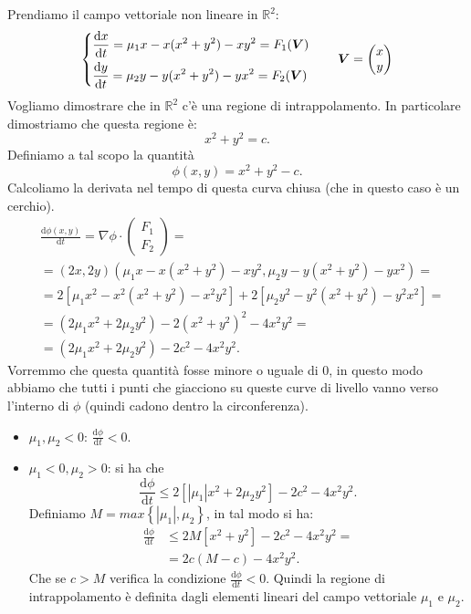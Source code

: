 \begin{exmp}
    Prendiamo il campo vettoriale non lineare in $\mathbb{R}^2$:
    \[
    \begin{dcases}
	\frac{\text{d} x}{\text{d} t} = \mu_1x-x(x^2+y^2) -xy^2 = F_1(\boldsymbol{V}) \\
	\frac{\text{d} y}{\text{d} t} = \mu_2y-y(x^2+y^2) -yx^2 = F_2(\boldsymbol{V}) 
    \end{dcases}
    \qquad \boldsymbol{V} = \begin{pmatrix} x \\ y \end{pmatrix}
    \]
    Vogliamo dimostrare che in $\mathbb{R}^2$ c'è una regione di intrappolamento. In particolare dimostriamo che questa regione è:
    \[
        x^2+y^2=c
    .\] 
    Definiamo a tal scopo la quantità
    \[
	\phi(x, y) = x^2+y^2-c
    .\] 
    Calcoliamo la derivata nel tempo di questa curva chiusa (che in questo caso è un cerchio).
    \[\begin{aligned}
	&\frac{\text{d} \phi (x, y) }{\text{d} t} = \nabla \phi  \cdot \begin{pmatrix} F_1 \\ F_2 \end{pmatrix} = \\
	&= (2x, 2y) (\mu_1x-x(x^2+y^2)-xy^2, \mu_2y-y(x^2+y^2) - yx^2) = \\
	&= 2\left[\mu_1x^2-x^2(x^2+y^2) - x^2 y^2\right] + 2\left[\mu_2y^2-y^2(x^2+y^2) - y^2x^2\right] = \\
	&= (2\mu_1x^2+2\mu_2y^2) - 2(x^2+y^2)^2 - 4 x^2y^2 = \\
	&= (2\mu_1x^2+2\mu_2y^2) -2c^2 - 4x^2y^2 
    .\end{aligned}\]
    Vorremmo che questa quantità fosse minore o uguale di $0$, in questo modo abbiamo che tutti i punti che giacciono su queste curve di livello vanno verso l'interno di $\phi$ (quindi cadono dentro la circonferenza).
    \begin{itemize}
        \item $\mu_1, \mu_2 < 0$: $\frac{\text{d} \phi}{\text{d} t} < 0 $.
	\item $\mu_1 < 0, \mu_2 > 0$: si ha che
	    \[
	        \frac{\text{d} \phi}{\text{d} t}  \le 2\left[\left|\mu_1\right|x^2+2\mu_2y^2\right]-2c^2-4x^2y^2
	    .\] 
	    Definiamo $M = max\left\{\left|\mu_1\right|, \mu_2\right\}$, in tal modo si ha:
	    \[\begin{aligned}
		\frac{\text{d} \phi}{\text{d} t}  &\le 2M\left[x^2+y^2\right]-2c^2-4x^2y^2 = \\
									   &=2c(M-c) - 4x^2y^2
	    .\end{aligned}\]
		Che se $c>M$ verifica la condizione $\frac{\text{d} \phi}{\text{d} t} < 0$. Quindi la regione di intrappolamento è definita dagli elementi lineari del campo vettoriale $\mu_1$ e $\mu_2$.
    \end{itemize}
\end{exmp}
